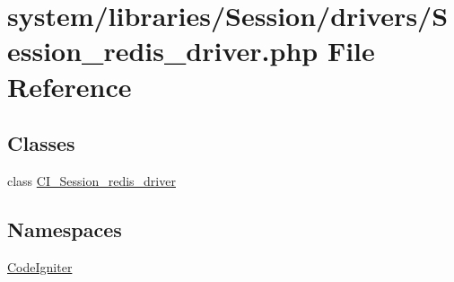 \hypertarget{_session__redis__driver_8php}{}\section{system/libraries/\+Session/drivers/\+Session\+\_\+redis\+\_\+driver.php File Reference}
\label{_session__redis__driver_8php}
\subsection*{Classes}
\begin{DoxyCompactItemize}
\item 
class \mbox{\hyperlink{class_c_i___session__redis__driver}{C\+I\+\_\+\+Session\+\_\+redis\+\_\+driver}}
\end{DoxyCompactItemize}
\subsection*{Namespaces}
\begin{DoxyCompactItemize}
\item 
 \mbox{\hyperlink{namespace_code_igniter}{Code\+Igniter}}
\end{DoxyCompactItemize}
